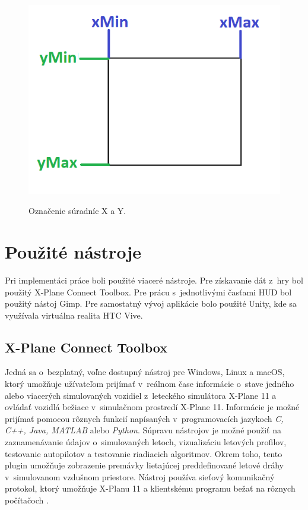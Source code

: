 \begin{figure}[ht]
\centering
\includegraphics[scale=0.39]{obrazky-figures/rectangle.png}
\caption{Označenie súradníc X a Y.}{\label{rectangle}}
\end{figure}

\section{Použité nástroje}
Pri implementáci práce boli použité viaceré nástroje. Pre získavanie dát z~hry bol použitý X-Plane Connect Toolbox. Pre prácu s~jednotlivými časťami HUD bol použitý nástoj Gimp. Pre samostatný vývoj aplikácie bolo použité Unity, kde sa využívala virtuálna realita HTC Vive.

\subsection{X-Plane Connect Toolbox}
Jedná sa o~bezplatný, voľne dostupný nástroj pre Windows, Linux a macOS, ktorý umožňuje užívateľom prijímať v~reálnom čase informácie o~stave jedného alebo viacerých simulovaných vozidiel z~leteckého simulátora X-Plane 11 a ovládať vozidlá bežiace v~simulačnom prostredí X-Plane 11. Informácie je možné prijímať pomocou rôznych funkcií napísaných v~programovacích jazykoch \textit{C, C++, Java, MATLAB} alebo \textit{Python}. Súpravu nástrojov je možné použiť na zaznamenávanie údajov o~simulovaných letoch, vizualizáciu letových profilov, testovanie autopilotov a testovanie riadiacich algoritmov. Okrem toho, tento plugin umožňuje zobrazenie premávky lietajúcej preddefinované letové dráhy v~simulovanom vzdušnom priestore. Nástroj používa sieťový komunikačný protokol, ktorý umožňuje X-Planu 11 a klientskému programu bežať na rôznych počítačoch \cite{xplaneConnect}.

